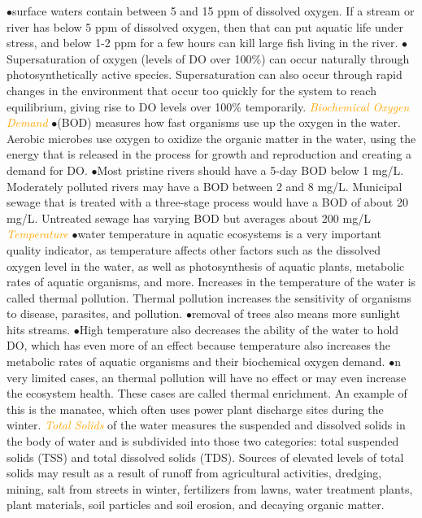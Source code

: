 \documentclass{article}
\newcommand{\ddd}{$\bullet$}
\newcommand{\orange}[1]{\textcolor{orange}{#1}}
\newcommand{\mysubsection}[1]{{\textit{\orange{#1}}}}
\begin{document}
\begin{multicols*}{4}
            \ddd surface waters contain between 5 and 15 ppm of dissolved oxygen. If a stream or river has below 5 ppm of dissolved oxygen, then that can put aquatic life under stress, and below 1-2 ppm for a few hours can kill large fish living in the river.
            \ddd Supersaturation of oxygen (levels of DO over 100\%) can occur naturally through photosynthetically active species. Supersaturation can also occur through rapid changes in the environment that occur too quickly for the system to reach equilibrium, giving rise to DO levels over 100\% temporarily. 
        \mysubsection{Biochemical Oxygen Demand}
            \ddd (BOD) measures how fast organisms use up the oxygen in the water. Aerobic microbes use oxygen to oxidize the organic matter in the water, using the energy that is released in the process for growth and reproduction and creating a demand for DO.
            \ddd Most pristine rivers should have a 5-day BOD below 1 mg/L. Moderately polluted rivers may have a BOD between 2 and 8 mg/L. Municipal sewage that is treated with a three-stage process would have a BOD of about 20 mg/L. Untreated sewage has varying BOD but averages about 200 mg/L    
        \mysubsection{Temperature}
            \ddd water temperature in aquatic ecosystems is a very important quality indicator, as temperature affects other factors such as the dissolved oxygen level in the water, as well as photosynthesis of aquatic plants, metabolic rates of aquatic organisms, and more. Increases in the temperature of the water is called thermal pollution. Thermal pollution increases the sensitivity of organisms to disease, parasites, and pollution.
            \ddd removal of trees also means more sunlight hits streams. 
            \ddd  High temperature also decreases the ability of the water to hold DO, which has even more of an effect because temperature also increases the metabolic rates of aquatic organisms and their biochemical oxygen demand. 
            \ddd n very limited cases, an thermal pollution will have no effect or may even increase the ecosystem health. These cases are called thermal enrichment. An example of this is the manatee, which often uses power plant discharge sites during the winter.
        \mysubsection{Total Solids} of the water measures the suspended and dissolved solids in the body of water and is subdivided into those two categories: total suspended solids (TSS) and total dissolved solids (TDS). Sources of elevated levels of total solids may result as a result of runoff from agricultural activities, dredging, mining, salt from streets in winter, fertilizers from lawns, water treatment plants, plant materials, soil particles and soil erosion, and decaying organic matter.
        

\end{multicols*}
\end{document}
